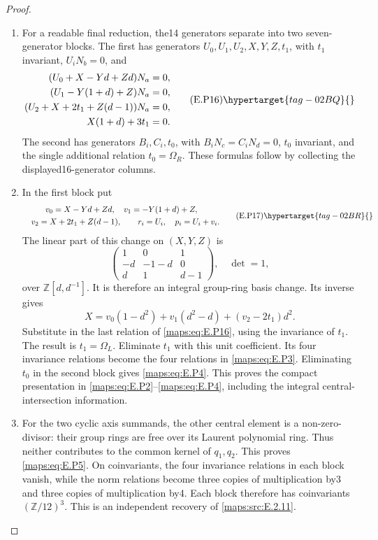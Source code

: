 \begin{proof}
\begin{enumerate}[label={$\langle1\rangle$\arabic*.},leftmargin=*]
\item For a readable final reduction, the14 generators
separate into two seven-generator blocks. The
first has generators $U_0,U_1,U_2,X,Y,Z,t_1$,
with $t_1$ invariant, $U_iN_b=0$, and
\[
 \begin{split}
 (U_0+X-Yd+Zd)N_a&=0,\\
 (U_1-Y(1+d)+Z)N_a&=0,\\
 (U_2+X+2t_1+Z(d-1))N_a&=0,\\
 X(1+d)+3t_1&=0.
 \end{split}
 \tag{E.P16}\hypertarget{tag-02BQ}{}\label{maps:eq:E.P16}
\]
The second has generators $B_i,C_i,t_0$, with
$B_iN_c=C_iN_d=0$, $t_0$ invariant, and the single
additional relation $t_0=\Omega_R$. These formulas
follow by collecting the displayed16-generator
columns.

\item In the first block put
\label{layout:V:1}
\[
\begin{gathered}
v_0=X-Yd+Zd,\quad v_1=-Y(1+d)+Z,
 \\
\quad v_2=X+2t_1+Z(d-1),\qquad
 r_i=U_i,\quad p_i=U_i+v_i.
\end{gathered}
\tag{E.P17}\hypertarget{tag-02BR}{}\label{maps:eq:E.P17}
\]
The linear part of this change on $(X,Y,Z)$ is
\[
 \begin{pmatrix}1&0&1\\-d&-1-d&0\\d&1&d-1\end{pmatrix},
 \quad\det=1,
\]
over $\mathbb Z[d,d^{-1}]$. It is therefore an
integral group-ring basis change. Its inverse gives
\[
 X=v_0(1-d^2)+v_1(d^2-d)+(v_2-2t_1)d^2.
\]
Substitute in the last relation of \eqref{maps:eq:E.P16}, using
the invariance of $t_1$. The result is
$t_1=\Omega_L$. Eliminate $t_1$ with this unit
coefficient. Its four invariance relations become
the four relations in \eqref{maps:eq:E.P3}. Eliminating $t_0$
in the second block gives \eqref{maps:eq:E.P4}. This proves the
compact presentation in \eqref{maps:eq:E.P2}--\eqref{maps:eq:E.P4}, including
the integral central-intersection information.

\item For the two cyclic axis summands, the other
central element is a non-zero-divisor: their
group rings are free over its Laurent polynomial
ring. Thus neither contributes to the common
kernel of $q_1,q_2$. This proves \eqref{maps:eq:E.P5}. On
coinvariants, the four invariance relations in
each block vanish, while the norm relations
become three copies of multiplication by3 and
three copies of multiplication by4. Each block
therefore has coinvariants $(\mathbb Z/12)^3$.
This is an independent recovery of \ref{maps:src:E.2.11}.


\end{enumerate}
\end{proof}
